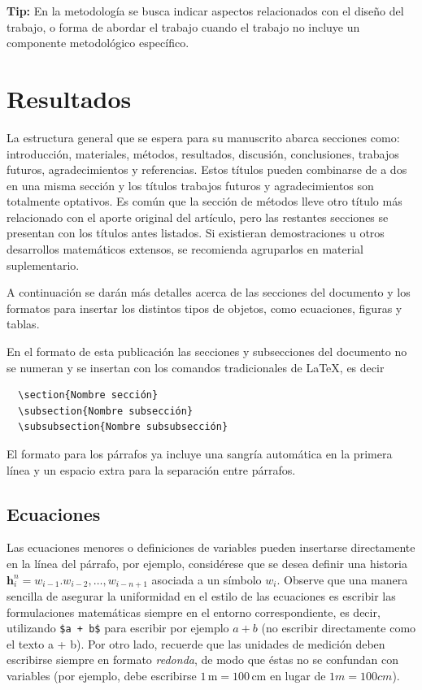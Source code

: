 \documentclass{sophicart}
\newcommand{\vect}[1]{\mathbf{#1}}  %
\begin{document}
\textbf{Tip:} En la metodología se busca indicar aspectos relacionados con el diseño del trabajo, o forma de abordar el trabajo cuando el trabajo no incluye un componente metodológico específico. 


\section{Resultados}

La estructura general que se espera para su manuscrito abarca secciones como: introducción,
materiales, métodos, resultados, discusión, conclusiones, trabajos futuros, agradecimientos y 
referencias. Estos títulos pueden combinarse de a dos en una misma sección y los títulos trabajos 
futuros y agradecimientos son totalmente optativos. Es común que la sección de métodos lleve otro 
título más relacionado con el aporte original del artículo, pero las restantes secciones se presentan
con los títulos antes listados. Si existieran demostraciones u otros desarrollos matemáticos extensos,
se recomienda agruparlos en material suplementario.

A continuación se darán más detalles acerca de las secciones del documento y los formatos para 
insertar los distintos tipos de objetos, como ecuaciones, figuras y tablas.

En el formato de esta publicación las secciones y subsecciones del documento no se numeran y 
se insertan con los comandos tradicionales de \LaTeX, es decir
\begin{verbatim}
  \section{Nombre sección}
  \subsection{Nombre subsección}
  \subsubsection{Nombre subsubsección}
\end{verbatim}
El formato para los párrafos ya incluye una sangría automática en la primera línea y un espacio extra para la separación entre párrafos.

\subsection{Ecuaciones}
Las ecuaciones menores o definiciones de variables pueden insertarse directamente en la línea del
párrafo, por ejemplo, considérese que se desea definir una historia $\vect{h}_i^n = w_{i-1}. w_{i-2},
\dots, w_{i-n+1}$ asociada a un símbolo $w_i$. Observe que una manera sencilla de asegurar la 
uniformidad en el estilo de las ecuaciones es escribir las formulaciones matemáticas siempre en el
entorno correspondiente, es decir, utilizando \verb!$a + b$! para escribir por ejemplo $a + b$
(no escribir directamente como el texto a + b). Por otro lado, recuerde que las unidades de medición
deben escribirse siempre en formato \emph{redonda}, de modo que éstas no se confundan con variables
(por ejemplo, debe escribirse $1\,\text{m} = 100\,\text{cm}$ en lugar de $1m = 100cm$).
\end{document}

